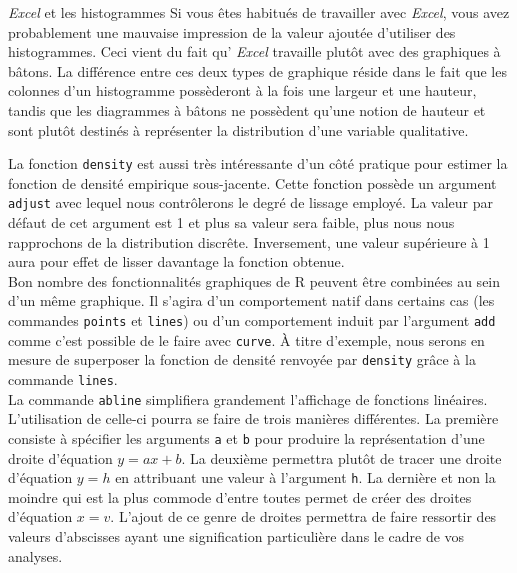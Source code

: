 \begin{moreInfo}{\emph{Excel} et les histogrammes}
	Si vous êtes habitués de travailler avec \emph{Excel}, vous avez probablement une mauvaise impression de la valeur ajoutée d'utiliser des histogrammes. Ceci vient du fait qu’ \emph{Excel} travaille plutôt avec des graphiques à bâtons. La différence entre ces deux types de graphique réside dans le fait que les colonnes d'un histogramme possèderont à la fois une largeur et une hauteur, tandis que les diagrammes à bâtons ne possèdent qu'une notion de hauteur et sont plutôt destinés à représenter la distribution d'une variable qualitative. 
\end{moreInfo}

La fonction \texttt{density} \cite{Rfunction:density} est aussi très intéressante d'un côté pratique pour estimer la fonction de densité empirique sous-jacente. Cette fonction possède un argument \texttt{adjust} avec lequel nous contrôlerons le degré de lissage employé. La valeur par défaut de cet argument est 1 et plus sa valeur sera faible, plus nous nous rapprochons de la distribution discrête. Inversement, une valeur supérieure à 1 aura pour effet de lisser davantage la fonction obtenue. \\

Bon nombre des fonctionnalités graphiques de R peuvent être combinées au sein d'un même graphique. Il s'agira d'un comportement natif dans certains cas (les commandes \texttt{points} et \texttt{lines}) ou d'un comportement induit par l'argument \texttt{add} comme c'est possible de le faire avec \texttt{curve}. À titre d'exemple, nous serons en mesure de superposer la fonction de densité renvoyée par \texttt{density} grâce à la commande \texttt{lines}.\\
 
La commande \texttt{abline} \cite{Rfunction:abline} simplifiera grandement l'affichage de fonctions linéaires. L'utilisation de celle-ci pourra se faire de trois manières différentes. La première consiste à spécifier les arguments \texttt{a} et \texttt{b} pour produire la représentation d'une droite d'équation $y = ax + b$. La deuxième permettra plutôt de tracer une droite d'équation $y = h$ en attribuant une valeur à l'argument \texttt{h}. La dernière et non la moindre qui est la plus commode d'entre toutes permet de créer des droites d'équation $x = v$. L'ajout de ce genre de droites permettra de faire ressortir des valeurs d'abscisses ayant une signification particulière dans le cadre de vos analyses. \\

